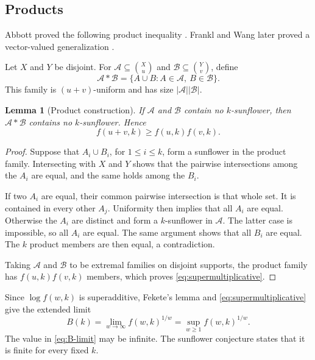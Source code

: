 \documentclass[11pt]{article}
\numberwithin{equation}{section}
\newtheorem{lemma}[lemma]{Lemma}
\theoremstyle{definition}
\theoremstyle{remark}
\begin{document}
\subsection{Products}

Abbott proved the following product inequality \cite{Abbott1966}. Frankl and
Wang later proved a vector-valued generalization \cite{FranklWang2025}.

Let $X$ and $Y$ be disjoint. For
$\mathcal A\subseteq\binom Xu$ and $\mathcal B\subseteq\binom Yv$, define
\[
 \mathcal A*\mathcal B
 =\{A\cup B:A\in\mathcal A,\ B\in\mathcal B\}.
\]
This family is $(u+v)$-uniform and has size
$|\mathcal A||\mathcal B|$.

\begin{lemma}[Product construction]
\label{lem:product}
If $\mathcal A$ and $\mathcal B$ contain no $k$-sunflower, then
$\mathcal A*\mathcal B$ contains no $k$-sunflower. Hence
\begin{equation}
 f(u+v,k)\ge f(u,k)f(v,k).
 \label{eq:supermultiplicative}
\end{equation}
\end{lemma}

\begin{proof}
Suppose that $A_i\cup B_i$, for $1\le i\le k$, form a sunflower in the
product family. Intersecting with $X$ and $Y$ shows that the pairwise
intersections among the $A_i$ are equal, and the same holds among the $B_i$.

If two $A_i$ are equal, their common pairwise intersection is that whole set.
It is contained in every other $A_j$. Uniformity then implies that all $A_i$
are equal. Otherwise the $A_i$ are distinct and form a $k$-sunflower in
$\mathcal A$. The latter case is impossible, so all $A_i$ are equal. The
same argument shows that all $B_i$ are equal. The $k$ product members are
then equal, a contradiction.

Taking $\mathcal A$ and $\mathcal B$ to be extremal families on disjoint
supports, the product family has $f(u,k)f(v,k)$ members, which proves
\cref{eq:supermultiplicative}.
\end{proof}

Since $\log f(w,k)$ is superadditive, Fekete's lemma \cite{Fekete1923} and
\cref{eq:supermultiplicative} give the extended limit
\begin{equation}
 B(k)=\lim_{w\to\infty}f(w,k)^{1/w}
     =\sup_{w\ge1}f(w,k)^{1/w}.
 \label{eq:B-limit}
\end{equation}
The value in \cref{eq:B-limit} may be infinite. The sunflower conjecture
states that it is finite for every fixed $k$.
\end{document}
